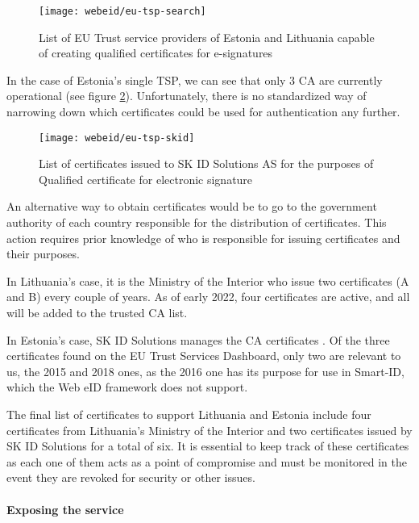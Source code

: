 \begin{figure}
    \centering
    \texttt{[image: webeid/eu-tsp-search]}
    \caption{List of EU Trust service providers of Estonia and Lithuania capable of creating qualified certificates for e-signatures}
    \label{fig:eu-tsp-list}
\end{figure}

In the case of Estonia's single TSP, we can see that only 3 CA are currently operational (see figure \ref{fig:eu-tsp-skid}). Unfortunately, there is no standardized way of narrowing down which certificates could be used for authentication any further.

\begin{figure}
    \centering
    \texttt{[image: webeid/eu-tsp-skid]}
    \caption{List of certificates issued to SK ID Solutions AS for the purposes of Qualified certificate for electronic signature}
    \label{fig:eu-tsp-skid}
\end{figure}

An alternative way to obtain certificates would be to go to the government authority of each country responsible for the distribution of certificates. This action requires prior knowledge of who is responsible for issuing certificates and their purposes.

In Lithuania's case, it is the Ministry of the Interior \cite{eid-lt-ministryofinterior-certificates} who issue two certificates (A and B) every couple of years. As of early 2022, four certificates are active, and all will be added to the trusted CA list.

In Estonia's case, SK ID Solutions manages the CA certificates \cite{eid-ee-skid-certificates}. Of the three certificates found on the EU Trust Services Dashboard, only two are relevant to us, the 2015 and 2018 ones, as the 2016 one has its purpose for use in Smart-ID, which the Web eID framework does not support.

The final list of certificates to support Lithuania and Estonia include four certificates from Lithuania's Ministry of the Interior and two certificates issued by SK ID Solutions for a total of six. It is essential to keep track of these certificates as each one of them acts as a point of compromise and must be monitored in the event they are revoked for security \cite{roca-vulnerability-lessons-learned} or other issues.

\paragraph{Exposing the service}

